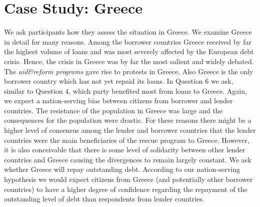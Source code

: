 \section{Case Study: Greece}
We ask participants how they assess the situation in Greece.  We examine Greece in detail for many reasons. Among the borrower countries Greece received by far the 
highest volume of loans and was most severely affected by the European debt crisis. Hence, the crisis in Greece was by far the most salient and widely debated. 
The \textit{aid\&reform programs} gave rise to protests in Greece. Also Greece is the only borrower country which has not yet repaid its loans. 
In Question 6 we ask, similar to Question 4, which party benefited most from loans
to Greece. Again, we expect a nation-serving bias between citizens from borrower
and lender countries. The resistance of the population in Greece was large and the consequences for the population were drastic. For these reasons there might be a higher level of consensus among the lender and borrower countries that the lender countries were the main beneficiaries of the rescue program to Greece. However, it is also conceivable that there is some level of solidarity between other lender countries and Greece causing 
the divergences to remain largely constant. We ask whether Greece will repay outstanding debt. According to 
our nation-serving hypothesis we would expect citizens from Greece (and potentially other borrower countries) to have a higher degree of confidence 
regarding the repayment of the outstanding level of debt than respondents from lender countries. 

